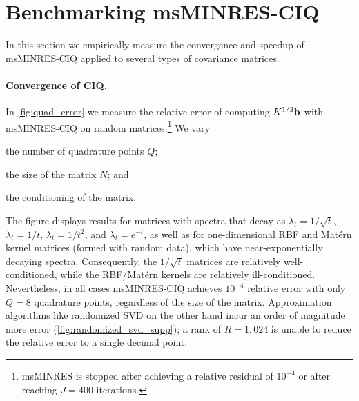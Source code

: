 
\section{Benchmarking msMINRES-CIQ}
\label{sec:ciq_empirical}

In this section we empirically measure the convergence and speedup of msMINRES-CIQ applied to several types of covariance matrices.

\paragraph{Convergence of CIQ.}
In \cref{fig:quad_error} we measure the relative error of computing $K^{1/2} \mathbf{b}$ with msMINRES-CIQ on random matrices.\footnote{
	msMINRES is stopped after achieving a relative residual of $10^{-4}$ or after reaching $J=400$ iterations.
}
We vary
%
\begin{enumerate*}
  \item the number of quadrature points $Q$;
  \item the size of the matrix $N$; and
  \item the conditioning of the matrix.
\end{enumerate*}
%
The figure displays results for matrices with spectra that decay as $\lambda_t = 1 / \sqrt{t}$, $\lambda_t = 1/t$, $\lambda_t = 1 / t^2$, and $\lambda_t = e^{-t}$,
as well as for one-dimensional RBF and Mat\'ern kernel matrices (formed with random data), which have near-exponentially decaying spectra.
Consequently, the $1 / \sqrt{t}$ matrices are relatively well-conditioned, while the RBF/Mat\'ern kernels are relatively ill-conditioned.
Nevertheless, in all cases msMINRES-CIQ achieves $10^{-4}$ relative error with only $Q=8$ quadrature points, regardless of the size of the matrix.
Approximation algorithms like randomized SVD on the other hand incur an order of magnitude more error (\cref{fig:randomized_svd_supp}); a rank of $R=1,\!024$ is unable to reduce the relative error to a single decimal point.

